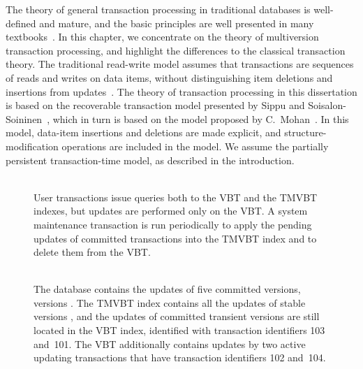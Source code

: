 The theory of general transaction processing in traditional 
databases is well-defined and mature, and the basic principles are
well presented in many
textbooks~\cite{bernstein:1987:cc-n-r,gray:1993:transactionprocessing,papadimitriou:1986:cc-theory}.
In this chapter, we concentrate on the theory of multiversion
transaction processing, and highlight the differences to the classical
transaction theory.
The traditional read-write model assumes that transactions are sequences
of reads and writes on data items, without distinguishing item deletions and
insertions from
updates~\cite{bernstein:1987:cc-n-r,papadimitriou:1986:cc-theory}.
The theory of transaction processing in this dissertation is based on
the recoverable transaction model presented by Sippu and
Soisalon-Soininen~\cite{sippu:2001:theory}, which in turn is based on the
model proposed by C.~Mohan~\cite{mohan:1990:aries-kvl,mohan:1992:aries-im}.
In this model, data-item insertions and deletions are made explicit,
and structure-modification operations are included in the model.
We assume the partially persistent transaction-time model, as
described in the introduction.

\begin{figure}[htb]
\begin{center}
  \\
  {User transactions issue queries both to the VBT and the
  TMVBT indexes, but updates are performed only on the VBT\@.
  A system maintenance transaction is run periodically to apply the
  pending updates of committed transactions into the TMVBT index and to
  delete them from the VBT\@.}
  \label{fig:cmvbt-setup}
\end{center}
\end{figure}

\begin{figure}[htb]
\begin{center}
  \\
  {The database contains the updates of five committed versions, versions
  . 
  The TMVBT index contains all the updates of stable versions
  , and the updates of committed transient versions 
  are still located in the VBT index, identified with transaction
  identifiers \num{103} and~\num{101}.
  The VBT additionally contains updates by two active updating transactions
  that have transaction identifiers \num{102} and~\num{104}.}
  \label{fig:cmvbt-example}
\end{center}
\end{figure}

